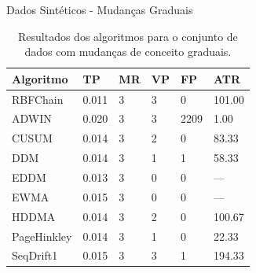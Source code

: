\documentclass[10pt]{beamer}
\begin{document}
\begin{frame}{Dados Sintéticos -  Mudanças Graduais}
    \begin{table}[ht]
        \centering
        \caption{Resultados dos algoritmos para o conjunto de dados com mudanças de conceito graduais.}
        \label{tbl:exp3}
        \begin{tabular}{llllll}

        \toprule
        Algoritmo              & TP                     & MR                     & VP                     & FP                     & ATR                    \\
        \midrule
        RBFChain               & \alert{0.011}          & 3                      & \alert{3}              & \alert{0}              & \alert{101.00}         \\
        ADWIN                  & 0.020                  & 3                      & 3                      & 2209                   & 1.00                   \\
        CUSUM                  & 0.014                  & 3                      & 2                      & 0                      & 83.33                  \\
        DDM                    & 0.014                  & 3                      & 1                      & 1                      & 58.33                  \\
        EDDM                   & 0.013                  & 3                      & 0                      & 0                      & ---                    \\
        EWMA                   & 0.015                  & 3                      & 0                      & 0                      & ---                    \\
        HDDMA                  & 0.014                  & 3                      & 2                      & 0                      & 100.67                 \\
        PageHinkley            & 0.014                  & 3                      & 1                      & 0                      & 22.33                  \\
        SeqDrift1              & 0.015                  & 3                      & \alert{3}              & \alert{1}              & \alert{194.33}         \\
        \bottomrule


        \end{tabular}
        \end{table}
\end{frame}
\end{document}
